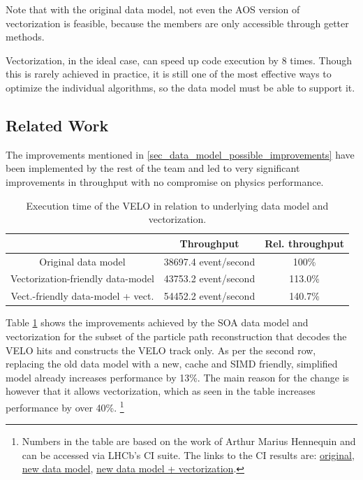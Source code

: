 \documentclass[12pt]{article}
\begin{document}
Note that with the original data model, not even the AOS version of vectorization is feasible, because the members are only accessible through getter methods.

Vectorization, in the ideal case, can speed up code execution by 8 times. Though this is rarely achieved in practice, it is still one of the most effective ways to optimize the individual algorithms, so the data model must be able to support it.


\subsection{Related Work}

The improvements mentioned in \ref{sec_data_model_possible_improvements} have been implemented by the rest of the team and led to very significant improvements in throughput with no compromise on physics performance.

\begin{table}[H]
	\centering
	\begin{tabular}{c | c | c}
		& Throughput & Rel. throughput \\
		\hline
		Original data model & 38697.4 event/second & 100\% \\
		\hline
		Vectorization-friendly data-model & 43753.2 event/second & 113.0\% \\
		\hline
		Vect.-friendly data-model + vect. & 54452.2 event/second & 140.7\%
	\end{tabular}
	\caption[Execution time of the VELO reconstruction algorithms]{Execution time of the 	VELO in relation to underlying data model and vectorization.}
	\label{tbl_datamodel_speedup_simd}
\end{table}

Table \ref{tbl_datamodel_speedup_simd} shows the improvements achieved by the SOA data model and vectorization for the subset of the particle path reconstruction that decodes the VELO hits and constructs the VELO track only. As per the second row, replacing the old data model with a new, cache and SIMD friendly, simplified model already increases performance by 13\%. The main reason for the change is however that it allows vectorization, which as seen in the table increases performance by over 40\%.
\footnote{
	Numbers in the table are based on the work of Arthur Marius Hennequin and can be accessed via LHCb's CI suite. The links to the CI results are:
	\href{http://lhcbpr-hlt.web.cern.ch/lhcbpr-hlt/PerfTests/UpgradeThroughput/Throughput_lhcb-head.2269_VeloOnly_x86_64+avx2+fma-centos7-gcc8-opt_2019-06-15_08:35:21_+0200/}{original},
	\href{http://lhcbpr-hlt.web.cern.ch/lhcbpr-hlt/PerfTests/UpgradeThroughput/Throughput_lhcb-head.2270_VeloOnly_x86_64+avx2+fma-centos7-gcc8-opt_2019-06-16_08:37:10_+0200/}{new data model},
	\href{http://lhcbpr-hlt.web.cern.ch/lhcbpr-hlt/PerfTests/UpgradeThroughput/Throughput_lhcb-head.2270_VeloOnlySIMD_x86_64+avx2+fma-centos7-gcc8-opt_2019-06-16_07:03:15_+0200/}{new data model + vectorization}.
} 
\vspace{1pc}
\end{document}
